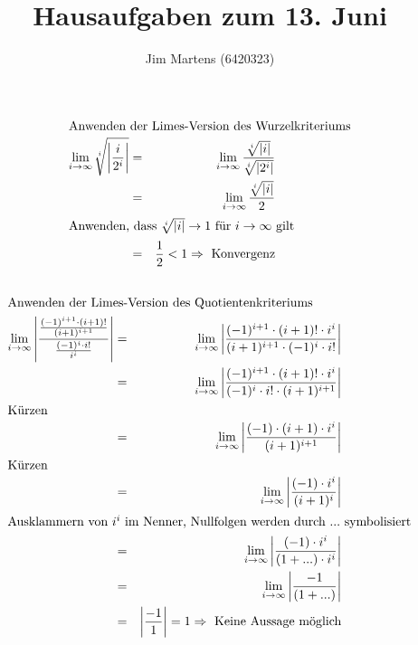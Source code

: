 \documentclass[10pt,a4paper,oneside,ngerman,numbers=noenddot]{scrartcl}
\begin{document}
\author{Jim Martens (6420323)}
\title{Hausaufgaben zum 13. Juni}
\maketitle
\section{} %
\subsection{} %
\begin{alignat*}{2}
\intertext{Anwenden der Limes-Version des Wurzelkriteriums}
\lim\limits_{i \rightarrow \infty} \sqrt[i]{\left| \frac{i}{2^{i}}\right|} &=& \lim\limits_{i \rightarrow \infty} \frac{\sqrt[i]{\left| i \right|}}{\sqrt[i]{\left| 2^{i}\right|}} \\
&=& \lim\limits_{i \rightarrow \infty} \frac{\sqrt[i]{|i|}}{2} \\
\intertext{Anwenden, dass $\sqrt[i]{|i|} \rightarrow 1$ für $i \rightarrow \infty$ gilt}
&=& \frac{1}{2} < 1 \Rightarrow \text{ Konvergenz}
\end{alignat*}
\subsection{} %
\begin{alignat*}{2}
\intertext{Anwenden der Limes-Version des Quotientenkriteriums}
\lim\limits_{i \rightarrow \infty}  \left|\frac{\frac{(-1)^{i+1} \cdot (i+1)!}{(i+1)^{i+1}}}{\frac{(-1)^{i} \cdot i!}{i^{i}}} \right| &=& \lim\limits_{i \rightarrow \infty} \left| \frac{(-1)^{i+1} \cdot (i+1)! \cdot i^{i}}{(i+1)^{i+1} \cdot (-1)^{i} \cdot i!}\right| \\
&=& \lim\limits_{i \rightarrow \infty} \left| \frac{(-1)^{i+1} \cdot (i+1)! \cdot i^{i}}{(-1)^{i} \cdot i! \cdot (i+1)^{i+1}}\right| \\
\intertext{Kürzen}
&=& \lim\limits_{i \rightarrow \infty} \left| \frac{(-1) \cdot (i+1) \cdot i^{i}}{(i+1)^{i+1}}\right|  \\
\intertext{Kürzen}
&=& \lim\limits_{i \rightarrow \infty} \left| \frac{(-1) \cdot i^{i}}{(i+1)^{i}}\right| \\
\intertext{Ausklammern von $i^{i}$ im Nenner, Nullfolgen werden durch $...$ symbolisiert}
&=& \lim\limits_{i \rightarrow \infty} \left| \frac{(-1) \cdot i^{i}}{(1 + ...) \cdot i^{i}}\right| \\
&=& \lim\limits_{i \rightarrow \infty} \left| \frac{-1}{(1 + ...)}\right| \\
&=& \left|\frac{-1}{1}\right| = 1 \Rightarrow \text{ Keine Aussage möglich}
\end{alignat*}
\end{document}
